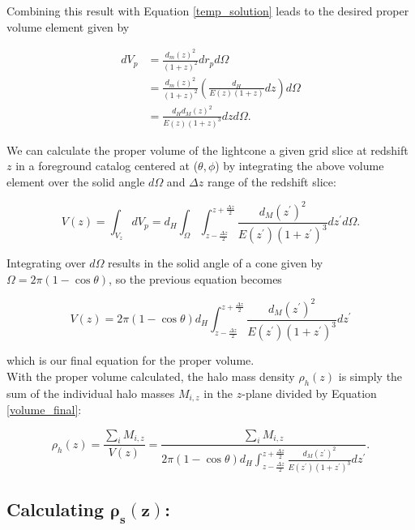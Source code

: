 \documentclass[12pt]{article}
\begin{document}
Combining this result with Equation \eqref{temp_solution} leads to the desired proper volume element given by

\begin{align}
dV_p&=\frac{d_m(z)^2}{(1+z)^2}dr_pd\Omega\nonumber\\
&=\frac{d_m(z)^2}{(1+z)^2}\left(\frac{d_H}{E(z)(1+z)}dz\right)d\Omega\nonumber\\
&=\frac{d_Hd_M(z)^2}{E(z)(1+z)^3}dzd\Omega.
\end{align}

We can calculate the proper volume of the lightcone a given grid slice at redshift $z$ in a foreground catalog centered at ($\theta,\phi$) by integrating the above volume element over the solid angle $d\Omega$ and $\Delta z$ range of the redshift slice:

\begin{equation}
V(z)=\int_{V_z}dV_p=d_H\int_\Omega\int_{z-\frac{\Delta z}{2}}^{z+\frac{\Delta z}{2}} \frac{d_M(z^\prime)^2}{E(z^\prime)(1+z^\prime)^3}dz^\prime d\Omega.
\end{equation}

Integrating over $d\Omega$ results in the solid angle of a cone given by $\Omega=2\pi(1-\cos\theta)$, so the previous equation becomes

\begin{equation}\label{volume_final}
V(z)=2\pi(1-\cos\theta)d_H\int_{z-\frac{\Delta z}{2}}^{z+\frac{\Delta z}{2}} \frac{d_M(z^\prime)^2}{E(z^\prime)(1+z^\prime)^3}dz^\prime
\end{equation}

which is our final equation for the proper volume.\\

With the proper volume calculated, the halo mass density $\rho_h(z)$ is simply the sum of the individual halo masses $M_{i,z}$ in the $z$-plane divided by Equation \eqref{volume_final}:

\begin{equation}\label{rho_h}
\rho_h(z)=\frac{\sum_i M_{i,z}}{V(z)}=\frac{\sum_i M_{i,z}}{2\pi(1-\cos\theta)d_H\int_{z-\frac{\Delta z}{2}}^{z+\frac{\Delta z}{2}} \frac{d_M(z^\prime)^2}{E(z^\prime)(1+z^\prime)^3}dz^\prime}.
\end{equation}

\subsection*{Calculating $\bm{\rho_s(z)}$:}
\end{document}
